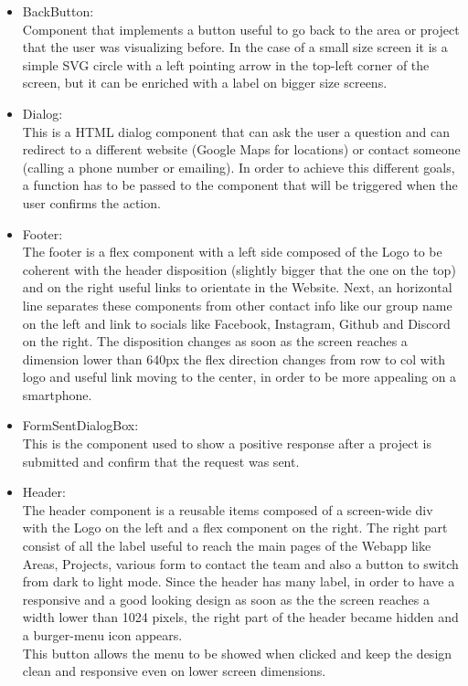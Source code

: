 \documentclass[11pt, letterpaper]{article}
\begin{document}
\begin{itemize}
    \item BackButton: \\
        Component that implements a button useful to go back to the area or project that the user was visualizing before. In the case of a small size screen it is a simple SVG circle with a left pointing arrow in the top-left corner of the screen, but it can be enriched with a label on bigger size screens.
    \item Dialog: \\
        This is a HTML dialog component that can ask the user a question and can redirect to a different website (Google Maps for locations) or contact someone (calling a phone number or emailing). In order to achieve this different goals, a function has to be passed to the component that will be triggered when the user confirms the action.
    \item Footer: \\
        The footer is a flex component with a left side composed of the Logo to be coherent with the header disposition (slightly bigger that the one on the top) and on the right useful links to orientate in the Website. Next, an horizontal line separates these components from other contact info like our group name on the left and link to socials like Facebook, Instagram, Github and Discord on the right.
        The disposition changes as soon as the screen reaches a dimension lower than 640px the flex direction changes from row to col with logo and useful link moving to the center, in order to be more appealing on a smartphone.
    \item FormSentDialogBox: \\
        This is the component used to show a positive response after a project is submitted and confirm that the request was sent.
    \item Header: \\
        The header component is a reusable items composed of a screen-wide div with the Logo on the left and a flex component on the right. The right part consist of all the label useful to reach the main pages of the Webapp like Areas, Projects, various form to contact the team and also a button to switch from dark to light mode. 
        Since the header has many label, in order to have a responsive and a good looking design as soon as the the screen reaches a width lower than 1024 pixels, the right part of the header became hidden and a burger-menu icon appears.\\
        This button allows the menu to be showed when clicked and keep the design clean and responsive even on lower screen dimensions.

\end{itemize}
\end{document}
